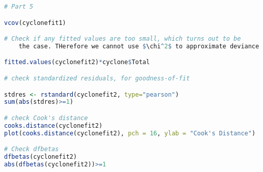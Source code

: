 \documentclass[12pt,a4paper]{article}
\begin{document}
\begin{lstlisting}[language=R]
# Part 5

vcov(cyclonefit1)

# Check if any fitted values are too small, which turns out to be 
	the case. THerefore we cannot use $\chi^2$ to approximate deviance.

fitted.values(cyclonefit2)*cyclone$Total

# check standardized residuals, for goodness-of-fit

stdres <- rstandard(cyclonefit2, type="pearson")
sum(abs(stdres)>=1)

# check Cook's distance
cooks.distance(cyclonefit2)
plot(cooks.distance(cyclonefit2), pch = 16, ylab = "Cook's Distance")

# Check dfbetas
dfbetas(cyclonefit2)
abs(dfbetas(cyclonefit2))>=1

\end{lstlisting}
\end{document}
